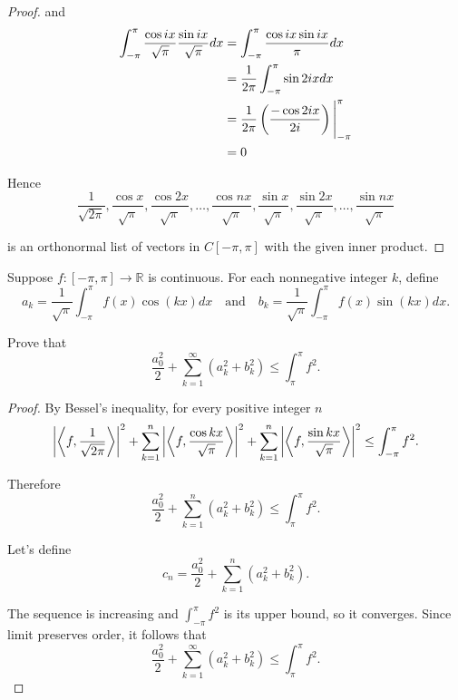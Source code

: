 \begin{proof}
    and
    \begin{align*}
        \int^{\pi}_{-\pi}\frac{\cos ix}{\sqrt{\pi}}\frac{\sin ix}{\sqrt{\pi}}dx & = \int^{\pi}_{-\pi}\frac{\cos ix \sin ix}{\pi}dx                            \\
                                                                                & = \frac{1}{2\pi}\int^{\pi}_{-\pi} \sin 2ix dx                               \\
                                                                                & = \frac{1}{2\pi}\left(\frac{-\cos 2ix}{2i}\right)\Biggl{\vert}^{\pi}_{-\pi} \\
                                                                                & = 0
    \end{align*}

    Hence
    \[
        \frac{1}{\sqrt{2\pi}}, \frac{\cos x}{\sqrt{\pi}}, \frac{\cos 2x}{\sqrt{\pi}}, \ldots, \frac{\cos nx}{\sqrt{\pi}}, \frac{\sin x}{\sqrt{\pi}}, \frac{\sin 2x}{\sqrt{\pi}}, \ldots, \frac{\sin nx}{\sqrt{\pi}}
    \]

    is an orthonormal list of vectors in $C[-\pi, \pi]$ with the given inner product.
\end{proof}
\newpage

\begin{exercise}
    Suppose $f: [-\pi, \pi] \to \mathbb{R}$ is continuous. For each nonnegative integer $k$, define
    \[
        a_{k} = \frac{1}{\sqrt{\pi}}\int^{\pi}_{-\pi} f(x)\cos(kx) dx\quad\text{and}\quad b_{k} = \frac{1}{\sqrt{\pi}}\int^{\pi}_{-\pi} f(x)\sin(kx) dx.
    \]

    Prove that
    \[
        \frac{a_{0}^{2}}{2} + \sum^{\infty}_{k=1}(a_{k}^{2} + b_{k}^{2}) \leq \int^{\pi}_{\pi} f^{2}.
    \]
\end{exercise}

\begin{proof}
    By Bessel's inequality, for every positive integer $n$
    \[
        \left\vert{\left\langle{f, \frac{1}{\sqrt{2\pi}}}\right\rangle}\right\vert^{2} + \sum^{n}_{k=1}\left\vert{\left\langle{f, \frac{\cos kx}{\sqrt{\pi}}}\right\rangle}\right\vert^{2} + \sum^{n}_{k=1}\left\vert{\left\langle{f, \frac{\sin kx}{\sqrt{\pi}}}\right\rangle}\right\vert^{2} \leq \int^{\pi}_{-\pi} f^{2}.
    \]

    Therefore
    \[
        \frac{a_{0}^{2}}{2} + \sum^{n}_{k=1}(a_{k}^{2} + b_{k}^{2}) \leq \int^{\pi}_{\pi} f^{2}.
    \]

    Let's define
    \[
        c_{n} = \frac{a_{0}^{2}}{2} + \sum^{n}_{k=1}(a_{k}^{2} + b_{k}^{2}).
    \]

    The sequence is increasing and $\int^{\pi}_{-\pi} f^{2}$ is its upper bound, so it converges. Since limit preserves order, it follows that
    \[
        \frac{a_{0}^{2}}{2} + \sum^{\infty}_{k=1}(a_{k}^{2} + b_{k}^{2}) \leq \int^{\pi}_{\pi} f^{2}.
    \]
\end{proof}
\newpage

